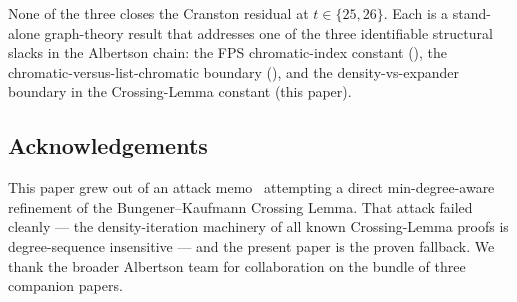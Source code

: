 \documentclass[11pt,a4paper]{article}
\theoremstyle{definition}
\begin{document}
\noindent
None of the three closes the Cranston residual at
$t \in \{25, 26\}$. Each is a stand-alone graph-theory result
that addresses one of the three identifiable structural slacks in
the Albertson chain: the FPS chromatic-index constant
(\cite{D8}), the chromatic-versus-list-chromatic boundary
(\cite{D15}), and the density-vs-expander boundary in the
Crossing-Lemma constant (this paper).

\subsection*{Acknowledgements}

This paper grew out of an attack memo~\cite{D13} attempting a
direct min-degree-aware refinement of the Bungener--Kaufmann
Crossing Lemma. That attack failed cleanly --- the density-iteration
machinery of all known Crossing-Lemma proofs is degree-sequence
insensitive --- and the present paper is the proven fallback. We
thank the broader Albertson team for collaboration on the bundle
of three companion papers.
\end{document}
